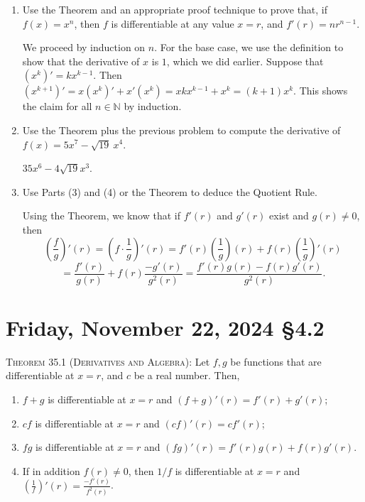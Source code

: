 \documentclass[12pt]{amsart}
\def\Fr{Friday}
\newcommand{\N}{\mathbb{N}}
\numberwithin{equation}{section}
\theoremstyle{plain} %
\newcommand{\Nov}[3]{\section{#2, November #1, 2024 \quad \S#3}}
\theoremstyle{definition}
\theoremstyle{remark}
\begin{document}
\begin{enumerate}
\item Use the Theorem and an appropriate proof technique to prove that, if $f(x)=x^n$, then $f$ is differentiable at any value $x=r$, and $f'(r)=n r^{n-1}$.

  \begin{framed}
  We proceed by induction on $n$.
For the base case, we use the definition to show that the derivative of $x$ is $1$, which we did earlier. 
Suppose that $(x^k)' = k x^{k-1}$. Then $(x^{k+1})' = x (x^k)' + x' (x^k) = x kx^{k-1} + x^k = (k+1) x^k$. This shows the claim for all $n\in \N$ by induction.
\end{framed}

 \item Use the Theorem plus the previous problem to compute the derivative of $f(x) = 5x^7 - \sqrt{19} \ x^4$.
 
  \begin{framed}
  $35 x^6 - 4 \sqrt{19} x^3$.
  \end{framed}
 
 \item Use Parts (3) and (4) or the Theorem to deduce the Quotient Rule.
 
 \begin{framed}
 Using the Theorem, we know that if $f'(r)$ and $g'(r)$ exist and $g(r)\neq 0$, then
 \[ \left( \frac{f}{g}\right)'(r) = \left( f\cdot\frac{1}{g}\right)'(r) = f'(r) \left( \frac{1}{g}\right)(r) +  f(r) \left( \frac{1}{g}\right)'(r) \]
 \[ = \frac{f'(r)}{g(r)} +  f(r) \frac{-g'(r)}{g^2(r)} = \frac{f'(r) g(r) - f(r)g'(r)}{g^2(r)}.\]
 \end{framed}
 \end{enumerate}
 
 \newpage
 
\Nov{22}{\Fr}{4.2}
 


 \begin{framed}
  \noindent \textsc{Theorem 35.1 (Derivatives and Algebra):}   Let $f,g$ be functions that are differentiable at $x=r$, and $c$ be a real number. Then,
 \begin{enumerate}
 \item $f+g$ is differentiable at $x=r$ and $(f+g)'(r) = f'(r) + g'(r)$;
 \item $cf$ is differentiable at $x=r$ and $(cf)'(r) = c f'(r)$;
 \item $fg$ is differentiable at $x=r$ and $(fg)'(r) = f'(r) g(r) + f(r) g'(r)$.
 \item If in addition $f(r)\neq 0$, then $1/f$ is differentiable at $x=r$ and $\displaystyle \left(\frac{1}{f}\right)'\!\!(r)= \frac{-f'(r)}{f^2(r)}$.
    \end{enumerate}
 \end{framed}
\end{document}
